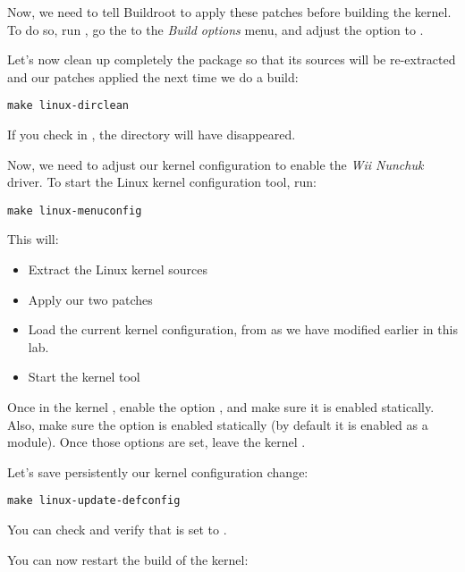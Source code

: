 Now, we need to tell Buildroot to apply these patches before building
the kernel. To do so, run , go the to the {\em Build
  options} menu, and adjust the  option
to .

Let's now clean up completely the  package so that its
sources will be re-extracted and our patches applied the next time we
do a build:

\begin{verbatim}
make linux-dirclean
\end{verbatim}

If you check in , the 
directory will have disappeared.

Now, we need to adjust our kernel configuration to enable the {\em Wii
Nunchuk} driver. To start the Linux kernel configuration tool, run:

\begin{verbatim}
make linux-menuconfig
\end{verbatim}

This will:

\begin{itemize}
\item Extract the Linux kernel sources
\item Apply our two patches
\item Load the current kernel configuration, from
   as we have modified
  earlier in this lab.
\item Start the kernel  tool
\end{itemize}

Once in the kernel , enable the option
, and make sure it is enabled
statically. Also, make sure the  option is
enabled statically (by default it is enabled as a module). Once those
options are set, leave the kernel .

Let's save persistently our kernel configuration change:

\begin{verbatim}
make linux-update-defconfig
\end{verbatim}

You can check  and
verify that  is set to .

You can now restart the build of the kernel:

